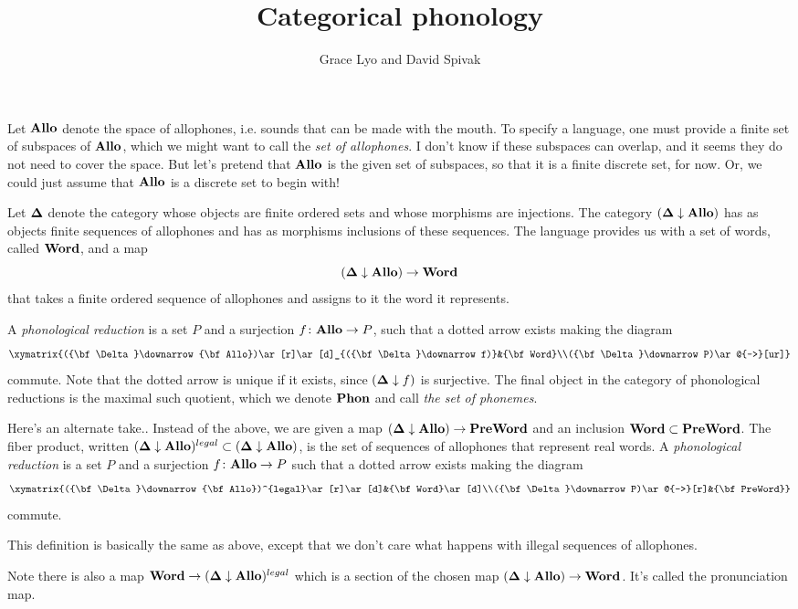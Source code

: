 \documentclass{amsart}
\def\Allo{{\bf Allo}}
\def\Phon{{\bf Phon}}
\def\Word{{\bf Word}}
\def\PreWord{{\bf PreWord}}
\def\D{{\bf \Delta}}
\def\down{\downarrow}
\begin{document}
\title{Categorical phonology}

\author{Grace Lyo and David Spivak}

\maketitle

Let $\Allo$ denote the space of allophones, i.e. sounds that can be made with the mouth.  To specify a language, one must provide a finite set of subspaces of $\Allo$, which we might want to call the {\em set of allophones}.  I don't know if these subspaces can overlap, and it seems they do not need to cover the space.  But let's pretend that $\Allo$ is the given set of subspaces, so that it is a finite discrete set, for now.  Or, we could just assume that $\Allo$ is a discrete set to begin with!

Let $\D$ denote the category whose objects are finite ordered sets and whose morphisms are injections.  The category $(\D\down\Allo)$ has as objects finite sequences of allophones and has as morphisms inclusions of these sequences.  The language provides us with a set of words, called $\Word$, and a map $$(\D\down\Allo)\to\Word$$ that takes a finite ordered sequence of allophones and assigns to it the word it represents.

\begin{definition}

A {\em phonological reduction} is a set $P$ and a surjection $f\taking\Allo\to P$, such that a dotted arrow exists making the diagram $$\xymatrix{(\D\down\Allo)\ar[r]\ar[d]_{(\D\down f)}&\Word\\(\D\down P)\ar@{-->}[ur]}$$ commute.  Note that the dotted arrow is unique if it exists, since $(\D\down f)$ is surjective.  The final object in the category of phonological reductions is the maximal such quotient, which we denote $\Phon$ and call {\em the set of phonemes}.

\end{definition}

Here's an alternate take..  Instead of the above, we are given a map $(\D\down\Allo)\to\PreWord$ and an inclusion $\Word\ss\PreWord$.  The fiber product, written $(\D\down\Allo)^{legal}\ss (\D\down\Allo)$, is the set of sequences of allophones that represent real words.  A {\em phonological reduction} is a set $P$ and a surjection $f\taking\Allo\to P$ such that a dotted arrow exists making the diagram $$\xymatrix{(\D\down\Allo)^{legal}\ar[r]\ar[d]&\Word\ar[d]\\(\D\down P)\ar@{-->}[r]&\PreWord}$$ commute.

This definition is basically the same as above, except that we don't care what happens with illegal sequences of allophones. 

Note there is also a map $\Word\to(\D\down\Allo)^{legal}$ which is a section of the chosen map $(\D\down\Allo)\to\Word$.  It's called the pronunciation map.
\end{document}
